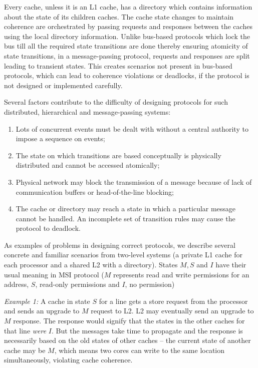 Every cache, unless it is an L1 cache, has a directory which contains
information about the state of its children caches. The cache state changes to
maintain coherence are orchestrated by passing requests and responses between
the caches using the local directory information.  Unlike bus-based protocols
which lock the bus till all the required state transitions are done thereby
ensuring atomicity of state transitions, in a message-passing protocol,
requests and responses are split leading to transient states. This creates
scenarios not present in bus-based protocols, which can lead to coherence
violations or deadlocks, if the protocol is not designed or implemented
carefully.

Several factors contribute to the difficulty of designing protocols for such
distributed, hierarchical and message-passing systems:

\begin{enumerate}
\item Lots of concurrent events must be dealt with without a central authority
to impose a sequence on events;
\item The state on which transitions are based conceptually is physically
distributed and cannot be accessed atomically;
\item Physical network may block the transmission of a message because of lack
of communication buffers or head-of-the-line blocking;
\item The cache or directory may reach a state in which a particular message
cannot be handled. An incomplete set of transition rules may cause the protocol
to deadlock.
\end{enumerate}

As examples of problems in designing correct protocols, we describe several
concrete and familiar scenarios from two-level systems (a private L1 cache for
each processor and a shared L2 with a directory). States $M, S$ and $I$ have their
usual meaning in MSI protocol ($M$ represents read and write permissions for an
address, $S$, read-only permissions and $I$, no permission)

\noindent \emph{Example 1:} A cache in state $S$ for a line gets a store
request from the processor and sends an upgrade to $M$ request to L2.  L2 may
eventually send an upgrade to $M$ response. The response would signify that the
states in the other caches for that line \emph{were} $I$. But the messages take
time to propagate and the response is necessarily based on the old states of
other caches -- the current state of another cache may be $M$, which means two
cores can write to the same location simultaneously, violating cache coherence.


